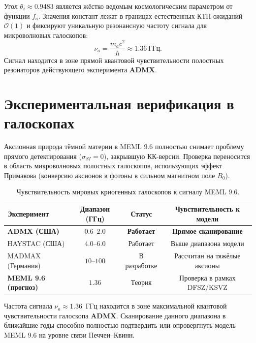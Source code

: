 \documentclass[12pt,a4paper]{article}
\begin{document}
Угол $\theta_i \approx 0.9483$ является жёстко ведомым космологическим параметром от функции $f_a$. Значения констант лежат в границах естественных КТП-ожиданий $\mathcal{O}(1)$ и фиксируют уникальную резонансную частоту сигнала для микроволновых галоскопов:
\begin{equation}
\nu_a = \frac{m_a c^2}{h} \approx 1.36 \ \text{ГГц}.
\end{equation}
Сигнал находится в зоне прямой квантовой чувствительности полостных резонаторов действующего эксперимента \textbf{ADMX}.

\section{Экспериментальная верификация в галоскопах}
Аксионная природа тёмной материи в MEML 9.6 полностью снимает проблему прямого детектирования ($\sigma_{SI} = 0$), закрывшую КК-версии. Проверка переносится в область микроволновых полостных галоскопов, использующих эффект Примакова (конверсию аксионов в фотоны в сильном магнитном поле $B_0$).

\begin{table}[h!]
\centering
\caption{Чувствительность мировых криогенных галоскопов к сигналу MEML 9.6.}
\label{tab:haloscopes}
\begin{tabular}{lccc}
\toprule
\textbf{Эксперимент} & \textbf{Диапазон (ГГц)} & \textbf{Статус} & \textbf{Чувствительность к модели} \\
\midrule
\textbf{ADMX (США)}   & $0.6$--$2.0$ & \textbf{Работает} & \textbf{Прямое сканирование} \\
HAYSTAC (США) & $4.0$--$6.0$ & Работает & Выше диапазона модели \\
MADMAX (Германия) & $10$--$100$ & В разработке & Рассчитан на тяжёлые аксионы \\
\midrule
\textbf{MEML 9.6 (прогноз)} & $\mathbf{1.36}$ & Теория & Проверка в рамках DFSZ/KSVZ \\
\bottomrule
\end{tabular}
\end{table}

Частота сигнала $\nu_a \approx 1.36$~ГГц находится в зоне максимальной квантовой чувствительности галоскопа \textbf{ADMX}. Сканирование данного диапазона в ближайшие годы способно полностью подтвердить или опровергнуть модель MEML 9.6 на уровне связи Печчеи--Квинн.
\end{document}
